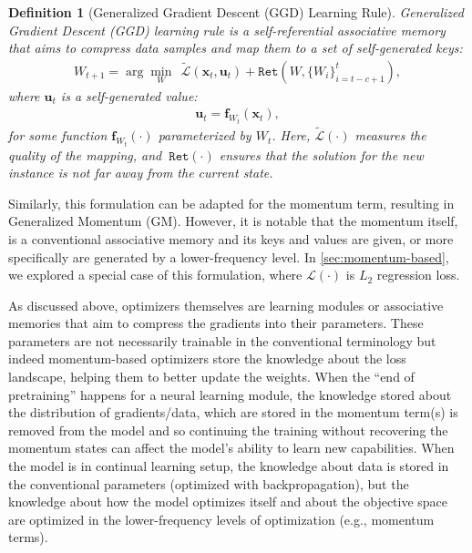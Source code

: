 \documentclass{article}
\newtheorem{dfn}{Definition}
\newcommand{\head}[1]{\vspace{1.7mm}\noindent{{\textcolor{c4}{\bf #1.}}}}
\newcommand{\vu}{\boldsymbol{u}}
\newcommand{\vx}{\boldsymbol{x}}
\begin{document}
{\begin{dfn}[Generalized Gradient Descent (GGD) Learning Rule]
Generalized Gradient Descent (GGD) learning rule is a self-referential associative memory that aims to compress data samples and map them to a set of self-generated keys:
    \begin{align}
        W_{t+1} = \arg\min_{W} \:\: \tilde{\mathcal{L}} \left(\vx_t, \vu_t \right) +  \texttt{Ret}\left(W, \{W_i\}_{i = t - c + 1}^{t} \right),
    \end{align}
    where $\vu_t$ is a {self-generated} value:
    \begin{align}
        \vu_t = \boldsymbol{f}_{W_t}\left( \vx_t \right),
    \end{align}
    for some function $\boldsymbol{f}_{W_t}(\cdot)$ parameterized by $W_t$. Here,  $\tilde{\mathcal{L}} \left(\cdot\right)$ measures the quality of the mapping, and $\:\texttt{Ret}(\cdot)$ ensures that the solution for the new instance is not far away from the current state. 
\end{dfn}
Similarly, this formulation can be adapted for the momentum term, resulting in Generalized Momentum (GM). However, it is notable that the momentum itself, is a conventional associative memory and its keys and values are given, or more specifically are generated by a lower-frequency level. In \autoref{sec:momentum-based}, we explored a special case of this formulation, where $\mathcal{L}(\cdot)$ is $L_2$ regression loss. 

\head{A Note on Optimizers in Continual Learning Setup} 
As discussed above, optimizers themselves are learning modules or associative memories that aim to compress the gradients into their parameters. These parameters are not necessarily trainable in the conventional terminology but indeed momentum-based optimizers store the knowledge about the loss landscape, helping them to better update the weights. When the ``end of pretraining'' happens for a neural learning module, the knowledge stored about the distribution of gradients/data, which are stored in the momentum term(s) is removed from the model and so continuing the training without recovering the momentum states can affect the model's ability to learn new capabilities. When the model is in continual learning setup, the knowledge about data is stored in the conventional parameters (optimized with backpropagation), but the knowledge about how the model optimizes itself and about the objective space are optimized in the lower-frequency levels of optimization (e.g., momentum terms).

}
\end{document}
